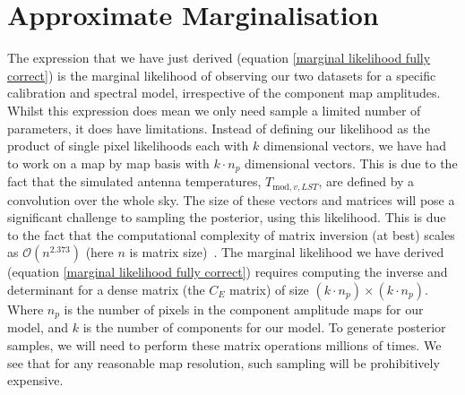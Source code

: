 \documentclass[fleqn,usenatbib]{mnras}
\begin{document}
\section{Approximate Marginalisation}\label{approximate marginalisation}
The expression that we have just derived (equation \ref{marginal likelihood fully correct}) is the marginal likelihood of observing our two datasets for a specific calibration and spectral model, irrespective of the component map amplitudes. Whilst this expression does mean we only need sample a limited number of parameters, it does have limitations. Instead of defining our likelihood as the product of single pixel likelihoods each with $k$ dimensional vectors, we have had to work on a map by map basis with $k\cdot n_p$ dimensional vectors. This is due to the fact that the simulated antenna temperatures, $T_{\mathrm{mod},v,LST}$, are defined by a convolution over the whole sky. The size of these vectors and matrices will pose a significant challenge to sampling the posterior, using this likelihood. This is due to the fact that the computational complexity of matrix inversion (at best) scales as $\mathcal{O}(n^{2.373})$ (here $n$ is matrix size)~\citep{Davie2013}. The marginal likelihood we have derived (equation \ref{marginal likelihood fully correct}) requires computing the inverse and determinant for a dense matrix (the $C_E$ matrix) of size $(k\cdot n_p)\times (k\cdot n_p)$. Where $n_p$ is the number of pixels in the component amplitude maps for our model, and $k$ is the number of components for our model. To generate posterior samples, we will need to perform these matrix operations millions of times. We see that for any reasonable map resolution, such sampling will be prohibitively expensive.
\end{document}
